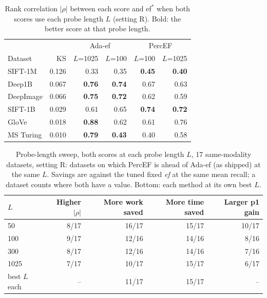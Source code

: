 \documentclass[sigconf,review=false,screen]{acmart}
\newcommand{\ef}{\textit{ef}}
\begin{document}
\begin{table}[t]
  \caption{Rank correlation $|\rho|$ between each score and $\mathrm{ef}^*$ when both scores use
  each probe length $L$ (setting R). Bold: the better score at that probe length.}
  \label{tab:ablation}
  \centering\footnotesize
  \begin{tabular}{lrrrrr}
    \toprule
    & & \multicolumn{2}{c}{Ada-ef} & \multicolumn{2}{c}{PercEF} \\
    Dataset & KS & $L$=1025 & $L$=100 & $L$=100 & $L$=1025 \\
    \midrule
    SIFT-1M   & 0.126 & 0.33 & 0.35 & \textbf{0.45} & \textbf{0.40} \\
    Deep1B    & 0.067 & \textbf{0.76} & \textbf{0.74} & 0.67 & 0.63 \\
    DeepImage & 0.066 & \textbf{0.75} & \textbf{0.72} & 0.62 & 0.59 \\
    SIFT-1B   & 0.029 & 0.61 & 0.65 & \textbf{0.74} & \textbf{0.72} \\
    GloVe     & 0.018 & \textbf{0.88} & 0.62 & 0.61 & 0.76 \\
    MS Turing & 0.010 & \textbf{0.79} & \textbf{0.43} & 0.40 & 0.58 \\
    \bottomrule
  \end{tabular}
\end{table}

\begin{table}[t]
  \caption{Probe-length sweep, both scores at each probe length $L$, 17 same-modality datasets,
  setting R: datasets on which PercEF is ahead of Ada-ef (as shipped) at the same $L$. Savings are
  against the tuned fixed \ef{} at the same mean recall; a dataset counts where both have a value.
  Bottom: each method at its own best $L$.}
  \label{tab:probes}
  \centering\footnotesize\setlength{\tabcolsep}{3.5pt}
  \begin{tabular}{lrrrr}
    \toprule
    $L$ & Higher $|\rho|$ & More work saved & More time saved & Larger p1 gain \\
    \midrule
    50   &  8/17 & 16/17 & 15/17 & 10/17 \\
    100  &  9/17 & 12/16 & 14/16 &  8/16 \\
    300  &  8/17 & 12/16 & 14/16 &  7/16 \\
    1025 &  7/17 & 10/17 & 15/17 &  6/17 \\
    \midrule
    best $L$ each & -- & 11/17 & 15/17 & -- \\
    \bottomrule
  \end{tabular}
\end{table}
\end{document}
